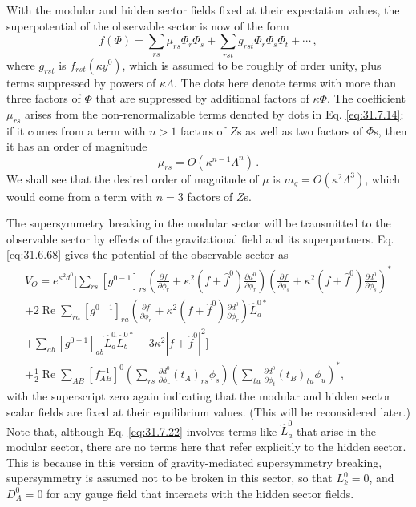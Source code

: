With the modular and hidden sector fields fixed at their expectation values,
the superpotential of the observable sector is now of the form
\begin{equation}
  f(\Phi)
  =\sum_{rs}\mu_{rs}\Phi_r\Phi_s
   +\sum_{rst}g_{rst}\Phi_r\Phi_s\Phi_t+\cdots\,,
  \tag{31.7.20}\label{eq:31.7.20}
\end{equation}
where \(g_{rst}\) is \(f_{rst}(\kappa y^0)\), which is assumed to be roughly
of order unity, plus terms suppressed by powers of \(\kappa\Lambda\). The
dots here denote terms with more than three factors of \(\Phi\) that are
suppressed by additional factors of \(\kappa\Phi\). The coefficient
\(\mu_{rs}\) arises from the non-renormalizable terms denoted by dots in
Eq. \eqref{eq:31.7.14}; if it comes from a term with \(n>1\) factors of
\(Z\)s as well as two factors of \(\Phi\)s, then it has an order of
magnitude
\begin{equation}
  \mu_{rs}=O(\kappa^{n-1}\Lambda^n)\,.
  \tag{31.7.21}\label{eq:31.7.21}
\end{equation}
We shall see that the desired order of magnitude of \(\mu\) is
\(m_g=O(\kappa^2\Lambda^3)\), which would come from a term with \(n=3\)
factors of \(Z\)s.

The supersymmetry breaking in the modular sector will be transmitted to the
observable sector by effects of the gravitational field and its
superpartners. Eq. \eqref{eq:31.6.68} gives the potential of the observable
sector as
\begin{multline}
  V_O=e^{\kappa^2d^0}\Biggl[
  \sum_{rs}[g^{0-1}]_{rs}
  \left(
    \frac{\partial f}{\partial\phi_r}
    +\kappa^2(f+\widehat f^0)\frac{\partial d^0}{\partial\phi_r}
  \right)
  \left(
    \frac{\partial f}{\partial\phi_s}
    +\kappa^2(f+\widehat f^0)\frac{\partial d^0}{\partial\phi_s}
  \right)^*
  \\
  +2\operatorname{Re}\sum_{ra}[g^{0-1}]_{ra}
  \left(
    \frac{\partial f}{\partial\phi_r}
    +\kappa^2(f+\widehat f^0)\frac{\partial d^0}{\partial\phi_r}
  \right)\widehat L_a^{0*}
  \\
  +\sum_{ab}[g^{0-1}]_{ab}\widehat L_a^0\widehat L_b^{0*}
  -3\kappa^2|f+\widehat f^0|^2
  \Biggr]
  \\
  +\frac12\operatorname{Re}\sum_{AB}[f_{AB}^{-1}]^0
  \left(
    \sum_{rs}\frac{\partial d^0}{\partial\phi_r}
      (t_A)_{rs}\phi_s
  \right)
  \left(
    \sum_{tu}\frac{\partial d^0}{\partial\phi_t}
      (t_B)_{tu}\phi_u
  \right)^*,
  \tag{31.7.22}\label{eq:31.7.22}
\end{multline}
with the superscript zero again indicating that the modular and hidden
sector scalar fields are fixed at their equilibrium values. (This will be
reconsidered later.) Note that, although Eq. \eqref{eq:31.7.22} involves
terms like \(\widehat L_a^0\) that arise in the modular sector, there are no
terms here that refer explicitly to the hidden sector. This is because in
this version of gravity-mediated supersymmetry breaking, supersymmetry is
assumed not to be broken in this sector, so that \(L_k^0=0\), and
\(D_A^0=0\) for any gauge field that interacts with the hidden sector
fields.

